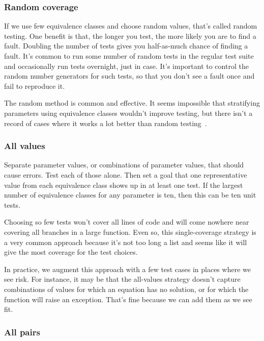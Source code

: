 \documentclass[fleqn,10pt]{olplainarticle}
\begin{document}
\subsubsection{Random coverage}

If we use few equivalence classes and choose
random values, that's called random testing. One benefit is
that, the longer you test, the more likely you are to find
a fault. Doubling the number of tests gives you half-as-much
chance of finding a fault. It's common to run some number
of random tests in the regular test suite and occasionally
run tests overnight, just in case. It's important to control
the random number generators for such tests, so that you don't
see a fault once and fail to reproduce it.

The random method is common and effective. It seems impossible
that stratifying parameters using equivalence classes wouldn't
improve testing, but there isn't a record of cases where
it works a lot better than random testing~\citep{arcuri2011random}.


\subsubsection{All values}

Separate parameter values, or combinations of parameter values,
that should cause errors. Test each of those alone.
Then set a goal that one representative value from each
equivalence class shows up in at least one test.
If the largest number of equivalence classes for any parameter
is ten, then this can be ten unit tests.

Choosing so few tests won't cover all lines of code
and will come nowhere near covering all branches in a
large function. Even so, this single-coverage strategy
is a very common approach because it's not too long a list
and seems like it will give the most coverage for the
test choices.

In practice, we augment this approach with a few test cases
in places where we see risk. For instance, it may be that
the all-values strategy doesn't capture combinations of
values for which an equation has no solution, or for which
the function will raise an exception. That's fine because
we can add them as we see fit.


\subsubsection{All pairs}
\end{document}
